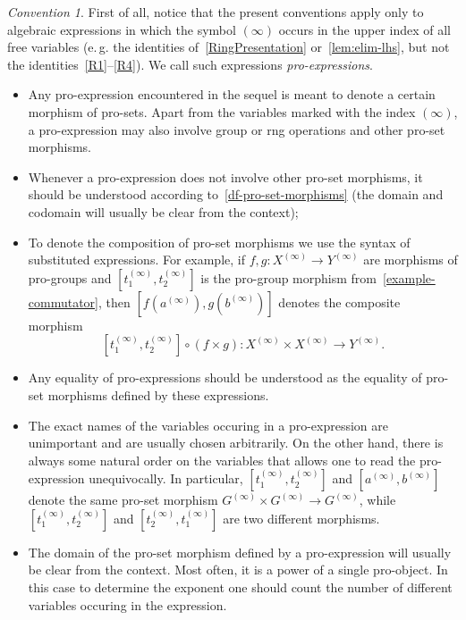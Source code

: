 \documentclass{article}
\numberwithin{equation}{section}
\theoremstyle{definition}
\theoremstyle{remark}
\newtheorem{conv}[lemma]{Convention} \Crefname{conv}{Convention}{Conventions}
\begin{document}
\begin{conv} \label{conv:notation}
First of all, notice that the present conventions apply only to algebraic expressions in which the symbol $(\infty)$ occurs in the upper index of all free variables (e.\,g. the identities of~\cref{RingPresentation} or~\cref{lem:elim-lhs}, but not the identities~\eqref{R1}--\eqref{R4}). We call such expressions {\it pro-expressions}.
 \begin{itemize}
  \item Any pro-expression encountered in the sequel is meant to denote a certain morphism of pro-sets. Apart from the variables marked with the index $(\infty)$, a pro-expression may also involve group or rng operations and other pro-set morphisms.
  \item Whenever a pro-expression does not involve other pro-set morphisms, it should be understood according to~\cref{df-pro-set-morphisms} (the domain and codomain will usually be clear from the context);
  \item To denote the composition of pro-set morphisms we use the syntax of substituted expressions. For example, if $f, g \colon X^{(\infty)} \to Y^{(\infty)}$ are morphisms of pro-groups and $[t_1^{(\infty)}, t_2^{(\infty)}]$ is the pro-group morphism from~\cref{example-commutator}, then $[f(a^{(\infty)}), g(b^{(\infty)})]$ denotes the composite morphism \[[t_1^{(\infty)}, t_2^{(\infty)}] \circ (f\times g) \colon X^{(\infty)} \times X^{(\infty)} \to Y^{(\infty)}.\]  
  \item Any equality of pro-expressions should be understood as the equality of pro-set morphisms defined by these expressions.
  \item The exact names of the variables occuring in a pro-expression are unimportant and are usually chosen arbitrarily. On the other hand, there is always some natural order on the variables that allows one to read the pro-expression unequivocally. In particular, $[t_1^{(\infty)}, t_2^{(\infty)}]$ and $[a^{(\infty)}, b^{(\infty)}]$ denote the same pro-set morphism $G^{(\infty)} \times G^{(\infty)} \to G^{(\infty)}$, while $[t_1^{(\infty)}, t_2^{(\infty)}]$ and $[t_2^{(\infty)}, t_1^{(\infty)}]$ are two different morphisms.
  \item The domain of the pro-set morphism defined by a pro-expression will usually be clear from the context. 
  Most often, it is a power of a single pro-object. In this case to determine the exponent one should count the number of different variables occuring in the expression.

\end{itemize}
\end{conv}
\end{document}
